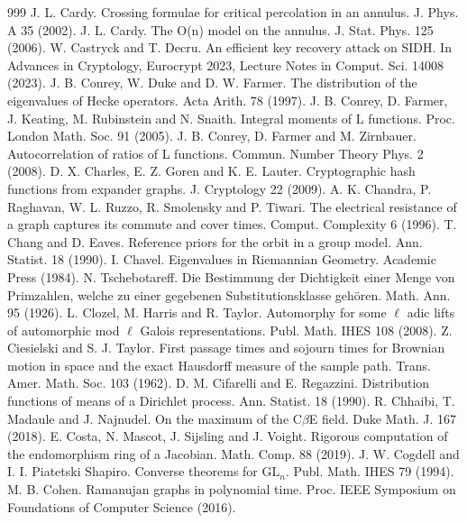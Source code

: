\begin{thebibliography}{999}
 J. L. Cardy. Crossing formulae for critical percolation in an annulus. J. Phys. A 35 (2002).
 J. L. Cardy. The O(n) model on the annulus. J. Stat. Phys. 125 (2006).
 W. Castryck and T. Decru. An efficient key recovery attack on SIDH. In Advances in Cryptology, Eurocrypt 2023, Lecture Notes in Comput. Sci. 14008 (2023).
 J. B. Conrey, W. Duke and D. W. Farmer. The distribution of the eigenvalues of Hecke operators. Acta Arith. 78 (1997).
 J. B. Conrey, D. Farmer, J. Keating, M. Rubinstein and N. Snaith. Integral moments of L functions. Proc. London Math. Soc. 91 (2005).
 J. B. Conrey, D. Farmer and M. Zirnbauer. Autocorrelation of ratios of L functions. Commun. Number Theory Phys. 2 (2008).
 D. X. Charles, E. Z. Goren and K. E. Lauter. Cryptographic hash functions from expander graphs. J. Cryptology 22 (2009).
 A. K. Chandra, P. Raghavan, W. L. Ruzzo, R. Smolensky and P. Tiwari. The electrical resistance of a graph captures its commute and cover times. Comput. Complexity 6 (1996).
 T. Chang and D. Eaves. Reference priors for the orbit in a group model. Ann. Statist. 18 (1990).
 I. Chavel. Eigenvalues in Riemannian Geometry. Academic Press (1984).
 N. Tschebotareff. Die Bestimmung der Dichtigkeit einer Menge von Primzahlen, welche zu einer gegebenen Substitutionsklasse geh\"oren. Math. Ann. 95 (1926).
 L. Clozel, M. Harris and R. Taylor. Automorphy for some $\ell$ adic lifts of automorphic mod $\ell$ Galois representations. Publ. Math. IHES 108 (2008).
 Z. Ciesielski and S. J. Taylor. First passage times and sojourn times for Brownian motion in space and the exact Hausdorff measure of the sample path. Trans. Amer. Math. Soc. 103 (1962).
 D. M. Cifarelli and E. Regazzini. Distribution functions of means of a Dirichlet process. Ann. Statist. 18 (1990).
 R. Chhaibi, T. Madaule and J. Najnudel. On the maximum of the C$\beta$E field. Duke Math. J. 167 (2018).
 E. Costa, N. Mascot, J. Sijsling and J. Voight. Rigorous computation of the endomorphism ring of a Jacobian. Math. Comp. 88 (2019).
 J. W. Cogdell and I. I. Piatetski Shapiro. Converse theorems for $\mathrm{GL}_n$. Publ. Math. IHES 79 (1994).
 M. B. Cohen. Ramanujan graphs in polynomial time. Proc. IEEE Symposium on Foundations of Computer Science (2016).

\end{thebibliography}
